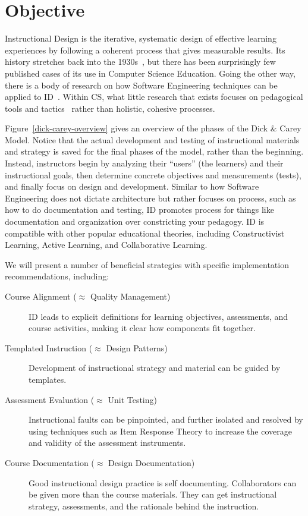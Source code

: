 \documentclass{sig-alternate}
\begin{document}
\section{Objective}

Instructional Design is the iterative, systematic design of effective learning experiences by following a coherent process that gives measurable results.
Its history stretches back into the 1930s~\cite{dick2005systematic}, but there has been surprisingly few published cases of its use in Computer Science Education.
Going the other way, there is a body of research on how Software Engineering techniques can be applied to ID~\cite{douglas-ooid, douglas-seid, tripp-rpid}.
Within CS, what little research that exists focuses on pedagogical tools and tactics~\cite{damian-id, hadjerrouit-id} rather than holistic, cohesive processes.

Figure~\ref{dick-carey-overview} gives an overview of the phases of the Dick \& Carey Model.
Notice that the actual development and testing of instructional materials and strategy is saved for the final phases of the model, rather than the beginning.
Instead, instructors begin by analyzing their ``users'' (the learners) and their instructional goals, then determine concrete objectives and measurements (tests), and finally focus on design and development.
Similar to how Software Engineering does not dictate architecture but rather focuses on process, such as how to do documentation and testing, ID promotes process for things like documentation and organization over constricting your pedagogy.
ID is compatible with other popular educational theories, including Constructivist Learning, Active Learning, and Collaborative Learning.

We will present a number of beneficial strategies with specific implementation recommendations, including:
\begin{description}
\item[Course Alignment ($\approx$ Quality Management)] 
ID leads to explicit definitions for learning objectives, assessments, and course activities, making it clear how components fit together.
\item[Templated Instruction ($\approx$ Design Patterns)] Develop\-ment of instructional strategy and material can be guided by templates.
\item[Assessment Evaluation ($\approx$ Unit Testing)] Instructional faults can be pinpointed, and further isolated and resolved by using techniques such as Item Response Theory to increase the coverage and validity of the assessment instruments.
\item[Course Documentation ($\approx$ Design Documentation)] Good instructional design practice is self documenting.
Collaborators can be given more than the course materials. They can get instructional strategy, assessments, and the rationale behind the instruction.
\end{description}
\end{document}

